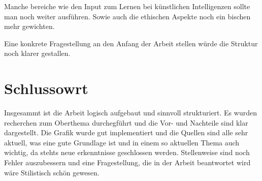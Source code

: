 \documentclass{article}
\begin{document}
Manche bereiche wie den Input zum Lernen bei künstlichen Intelligenzen sollte man noch weiter ausführen. Sowie auch die ethischen Aspekte noch ein bischen mehr gewichten.

Eine konkrete Fragestellung an den Anfang der Arbeit stellen würde die Struktur noch klarer gestallen.

\section{Schlussowrt}
Insgesammt ist die Arbeit logisch aufgebaut und sinnvoll strukturiert. Es wurden recherchen zum Oberthema durchegführt und die Vor- und Nachteile sind klar dargestellt. 
Die Grafik wurde gut implementiert und die Quellen sind alle sehr aktuell, was eine gute Grundlage ist und in einem so aktuellen Thema auch wichtig, da stehts neue erkenntnisse geschlossen werden.
Stellenweise sind noch Fehler auszubessern und eine Fragestellung, die in der Arbeit beantwortet wird wäre Stilistisch schön gewesen.

\printbibliography
\end{document}
